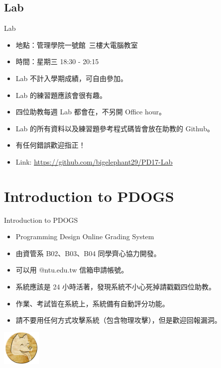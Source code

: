 \documentclass[t]{beamer}
\begin{document}
\subsection{Lab}
\begin{frame}{Lab}
  \begin{itemize}
    \item 地點：管理學院一號館\ 三樓大電腦教室
    \item 時間：星期三 18:30 - 20:15
    \item Lab 不計入學期成績，可自由參加。
    \item Lab 的練習題應該會很有趣。
    \item 四位助教每週 Lab 都會在，不另開 Office hour。
    \item Lab 的所有資料以及練習題參考程式碼皆會放在助教的 Github。
    \item 有任何錯誤歡迎指正！
    \item Link: \href{https://github.com/bigelephant29/PD17-Lab}{\underline{https://github.com/bigelephant29/PD17-Lab}}
  \end{itemize}
\end{frame}

\section{Introduction to PDOGS}
\begin{frame}{Introduction to PDOGS}
  \begin{itemize}
    \item Programming Design Online Grading System
    \item 由資管系 B02、B03、B04 同學齊心協力開發。
    \item 可以用 @ntu.edu.tw 信箱申請帳號。
    \item 系統應該是 24 小時活著，發現系統不小心死掉請戳戳四位助教。
    \item 作業、考試皆在系統上，系統備有自動評分功能。
    \item 請不要用任何方式攻擊系統（包含物理攻擊），但是歡迎回報漏洞。
  \end{itemize}
  \begin{center}
    \includegraphics[width=5em]{image/pdogs.png}
  \end{center}
\end{frame}
\end{document}
